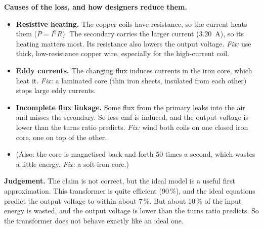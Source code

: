 \begin{practiceanswers}
\begin{practiceans}
\begin{modelanswer}
  \textbf{Causes of the loss, and how designers reduce them.}
  \begin{itemize}
    \item \textbf{Resistive heating.} The copper coils have resistance, so the current heats
          them ($P = I^2R$). The secondary carries the larger current (\qty{3.20}{A}), so
          its heating matters most. Its resistance also lowers the output voltage.
          \emph{Fix:} use thick, low-resistance copper wire, especially for the
          high-current coil.
    \item \textbf{Eddy currents.} The changing flux induces currents in the iron core,
          which heat it. \emph{Fix:} a laminated core (thin iron sheets, insulated from each
          other) stops large eddy currents.
    \item \textbf{Incomplete flux linkage.} Some flux from the primary leaks into the air
          and misses the secondary. So less emf is induced, and the output voltage is lower
          than the turns ratio predicts. \emph{Fix:} wind both coils on one closed iron
          core, one on top of the other.
    \item (Also: the core is magnetised back and forth 50 times a second, which wastes a
          little energy. \emph{Fix:} a soft-iron core.)
  \end{itemize}

  \textbf{Judgement.} The claim is not correct, but the ideal model is a useful first
  approximation. This transformer is quite efficient (90\,\%), and the ideal equations
  predict the output voltage to within about 7\,\%. But about 10\,\% of the input energy is
  wasted, and the output voltage is lower than the turns ratio predicts. So the transformer
  does not behave exactly like an ideal one.
  \end{modelanswer}
  \begin{markingcriteria}
  \end{markingcriteria}
\end{practiceans}


\end{practiceanswers}
